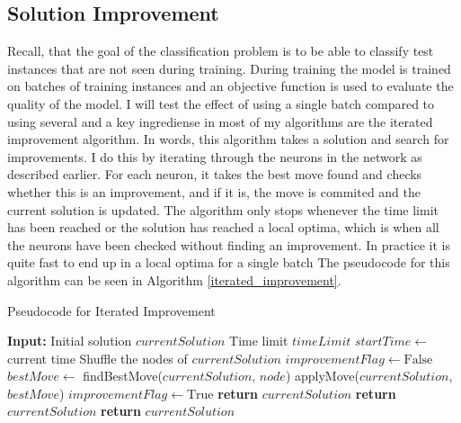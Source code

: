 \subsection{Solution Improvement}
Recall, that the goal of the classification problem is to be able to classify test instances that are not seen during training. During training the model is trained on batches of training instances and an objective function is used to evaluate the quality of the model. I will test the effect of using a single batch compared to using several and a key ingrediense in most of my algorithms are the iterated improvement algorithm. In words, this algorithm takes a solution and search for improvements. I do this by iterating through the neurons in the network as described earlier. For each neuron, it takes the best move found and checks whether this is an improvement, and if it is, the move is commited and the current solution is updated. The algorithm only stops whenever the time limit has been reached or the solution has reached a local optima, which is when all the neurons have been checked without finding an improvement. In practice it is quite fast to end up in a local optima for a single batch The pseudocode for this algorithm can be seen in Algorithm \ref{iterated_improvement}. 

\begin{algorithm}[H]
    \caption{Pseudocode for Iterated Improvement} \label{iterated_improvement}
    \begin{algorithmic}[1]  %
        \State \textbf{Input:}
        \State \hspace{\algorithmicindent} Initial solution $currentSolution$
        \State \hspace{\algorithmicindent} Time limit $timeLimit$
        \State $startTime \gets$ current time
            \State Shuffle the nodes of $currentSolution$
            \State $improvementFlag \gets \text{False}$
                \State $bestMove \gets$ findBestMove($currentSolution$, $node$)
                    \State applyMove($currentSolution$, $bestMove$)
                    \State $improvementFlag \gets \text{True}$
                \EndIf
                    \State \textbf{return} $currentSolution$
                \EndIf
            \EndFor
                \State \textbf{return} $currentSolution$
            \EndIf
        \EndWhile
        \State \textbf{return} $currentSolution$
    \end{algorithmic}
\end{algorithm}

